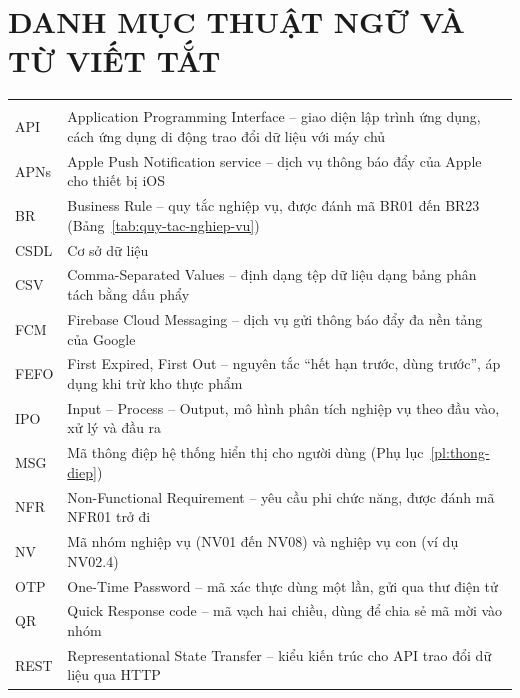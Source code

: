 \chapter*{DANH MỤC THUẬT NGỮ VÀ TỪ VIẾT TẮT}

{\small
\begin{longtable}{|L{3.6cm}|L{\dimexpr{}\arrayrulewidth-3.6cm\relax}|}
\hline
{} & \\ \hline
\endfirsthead
\hline
{} & \\ \hline
\endhead
API & Application Programming Interface – giao diện lập trình ứng dụng, cách ứng dụng di động trao đổi dữ liệu với máy chủ\\ \hline
APNs & Apple Push Notification service – dịch vụ thông báo đẩy của Apple cho thiết bị iOS\\ \hline
BR & Business Rule – quy tắc nghiệp vụ, được đánh mã BR01 đến BR23 (Bảng~\ref{tab:quy-tac-nghiep-vu})\\ \hline
CSDL & Cơ sở dữ liệu\\ \hline
CSV & Comma-Separated Values – định dạng tệp dữ liệu dạng bảng phân tách bằng dấu phẩy\\ \hline
FCM & Firebase Cloud Messaging – dịch vụ gửi thông báo đẩy đa nền tảng của Google\\ \hline
FEFO & First Expired, First Out – nguyên tắc “hết hạn trước, dùng trước”, áp dụng khi trừ kho thực phẩm\\ \hline
IPO & Input – Process – Output, mô hình phân tích nghiệp vụ theo đầu vào, xử lý và đầu ra\\ \hline
MSG & Mã thông điệp hệ thống hiển thị cho người dùng (Phụ lục~\ref{pl:thong-diep})\\ \hline
NFR & Non-Functional Requirement – yêu cầu phi chức năng, được đánh mã NFR01 trở đi\\ \hline
NV & Mã nhóm nghiệp vụ (NV01 đến NV08) và nghiệp vụ con (ví dụ NV02.4)\\ \hline
OTP & One-Time Password – mã xác thực dùng một lần, gửi qua thư điện tử\\ \hline
QR & Quick Response code – mã vạch hai chiều, dùng để chia sẻ mã mời vào nhóm\\ \hline
REST & Representational State Transfer – kiểu kiến trúc cho API trao đổi dữ liệu qua HTTP\\ \hline

\end{longtable}}

